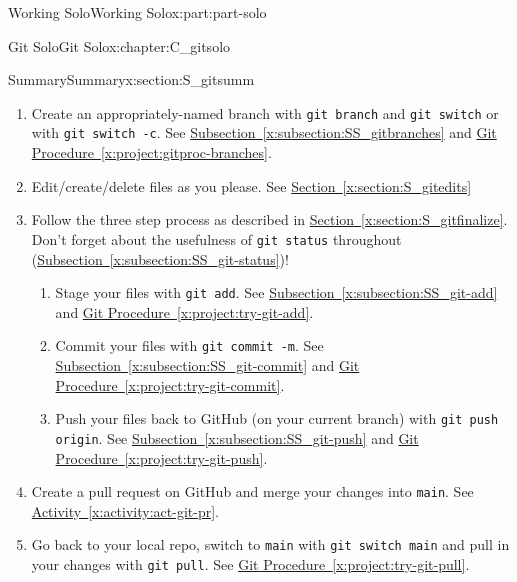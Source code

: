 \documentclass[oneside,10pt,]{book}
\newcommand{\xreffont}{\relax}
\newcommand{\mono}[1]{\texttt{#1}}
\begin{document}
\begin{partptx}{Working Solo}{}{Working Solo}{}{}{x:part:part-solo}
\begin{chapterptx}{Git Solo}{}{Git Solo}{}{}{x:chapter:C_gitsolo}
\begin{sectionptx}{Summary}{}{Summary}{}{}{x:section:S_gitsumm}
\begin{enumerate}
\item{}Create an appropriately-named branch with \mono{git branch} and \mono{git switch} or with \mono{git switch -c}. See \hyperref[x:subsection:SS_gitbranches]{Subsection~{\xreffont\ref{x:subsection:SS_gitbranches}}} and \hyperref[x:project:gitproc-branches]{Git Procedure~{\xreffont\ref{x:project:gitproc-branches}}}.%
\item{}Edit\slash{}create\slash{}delete files as you please. See \hyperref[x:section:S_gitedits]{Section~{\xreffont\ref{x:section:S_gitedits}}}%
\item{}Follow the three step process as described in \hyperref[x:section:S_gitfinalize]{Section~{\xreffont\ref{x:section:S_gitfinalize}}}. Don't forget about the usefulness of \mono{git status} throughout (\hyperref[x:subsection:SS_git-status]{Subsection~{\xreffont\ref{x:subsection:SS_git-status}}})!%
\begin{enumerate}
\item{}Stage your files with \mono{git add}. See \hyperref[x:subsection:SS_git-add]{Subsection~{\xreffont\ref{x:subsection:SS_git-add}}} and \hyperref[x:project:try-git-add]{Git Procedure~{\xreffont\ref{x:project:try-git-add}}}.%
\item{}Commit your files with \mono{git commit -m}. See \hyperref[x:subsection:SS_git-commit]{Subsection~{\xreffont\ref{x:subsection:SS_git-commit}}} and \hyperref[x:project:try-git-commit]{Git Procedure~{\xreffont\ref{x:project:try-git-commit}}}.%
\item{}Push your files back to GitHub (on your current branch) with \mono{git push origin}. See \hyperref[x:subsection:SS_git-push]{Subsection~{\xreffont\ref{x:subsection:SS_git-push}}} and \hyperref[x:project:try-git-push]{Git Procedure~{\xreffont\ref{x:project:try-git-push}}}.%
\end{enumerate}
%
\item{}Create a pull request on GitHub and merge your changes into \mono{main}. See \hyperref[x:activity:act-git-pr]{Activity~{\xreffont\ref{x:activity:act-git-pr}}}.%
\item{}Go back to your local repo, switch to \mono{main} with \mono{git switch main} and pull in your changes with \mono{git pull}. See \hyperref[x:project:try-git-pull]{Git Procedure~{\xreffont\ref{x:project:try-git-pull}}}.%
\end{enumerate}
%
\end{sectionptx}
%
%
\typeout{************************************************}

\end{chapterptx}
\end{partptx}
\end{document}
